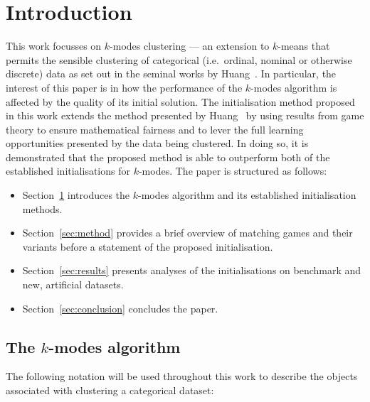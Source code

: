 \section{Introduction}\label{sec:intro}

This work focusses on \(k\)-modes clustering --- an extension to
\(k\)-means that permits the sensible clustering of categorical (i.e.\ ordinal,
nominal or otherwise discrete) data as set out in the seminal works by
Huang~\cite{Huang1997a,Huang1997b,Huang1998}. In particular, the interest of
this paper is in how the performance of the \(k\)-modes algorithm is affected by
the quality of its initial solution. The initialisation method proposed in this
work extends the method presented by Huang~\cite{Huang1998} by using results
from game theory to ensure mathematical fairness and to lever the full learning
opportunities presented by the data being clustered. In doing so, it is
demonstrated that the proposed method is able to outperform both of the
established initialisations for \(k\)-modes. The paper is structured as follows:
\begin{itemize}
    \item Section~\ref{sec:intro} introduces the \(k\)-modes algorithm and its
        established initialisation methods.
    \item Section~\ref{sec:method} provides a brief overview of
        matching games and their variants before a statement of the proposed
        initialisation.
    \item Section~\ref{sec:results} presents analyses of the initialisations
        on benchmark and new, artificial datasets.
    \item Section~\ref{sec:conclusion} concludes the paper.
\end{itemize}


\subsection{The \(k\)-modes algorithm}\label{subsec:kmodes}

The following notation will be used throughout this work to describe the objects
associated with clustering a categorical dataset:

